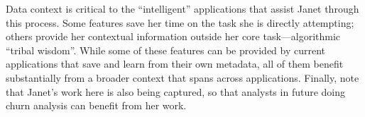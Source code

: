 \documentclass{sig-alternate}
\begin{document}

Data context is critical to the ``intelligent'' applications that assist Janet through this process. 
Some features save her time on the task she is directly attempting; others provide her contextual information outside her core task---algorithmic ``tribal wisdom''. While some of these features can be provided by current applications that save and learn from their own metadata, all of them benefit substantially from a broader context that spans across applications. Finally, note that Janet's work here is also being captured, so that analysts in future doing churn analysis can benefit from her work.
\end{document}
